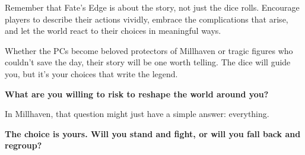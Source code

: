 \documentclass[11pt]{article}
\begin{document}
Remember that Fate's Edge is about the story, not just the dice rolls. Encourage players to describe their actions vividly, embrace the complications that arise, and let the world react to their choices in meaningful ways.

Whether the PCs become beloved protectors of Millhaven or tragic figures who couldn't save the day, their story will be one worth telling. The dice will guide you, but it's your choices that write the legend.

\begin{center}
\textbf{What are you willing to risk to reshape the world around you?}
\end{center}

In Millhaven, that question might just have a simple answer: everything.

\begin{center}

\vspace{1cm}

\textbf{The choice is yours. Will you stand and fight, or will you fall back and regroup?}
\end{center}
\end{document}
